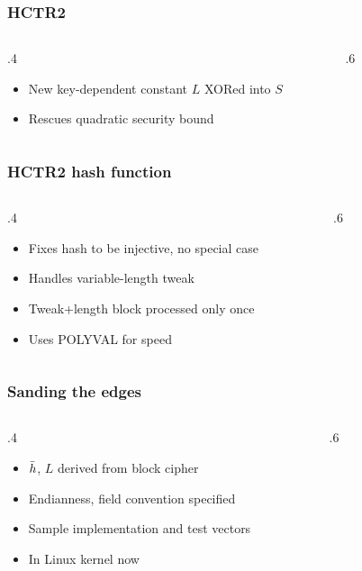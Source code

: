 \documentclass[aspectratio=169]{beamer}
\newenvironment*{figslide}{
    \begin{columns}
        \begin{column}{.4\textwidth}

}{
\end{column}
\begin{column}{.6\textwidth}
    \begin{figure}
        
    \end{figure}
\end{column}
\end{columns}
}
\begin{document}
\togglefalse{oldhctr}

\begin{frame}

\frametitle{HCTR2}
\begin{figslide}
    \begin{itemize}
        \item New key-dependent constant \(L\) XORed into \(S\)
        \item Rescues quadratic security bound
    \end{itemize}
\end{figslide}

\end{frame}

\begin{frame}

\frametitle{HCTR2 hash function}
\begin{figslide}
    \begin{itemize}
        \item Fixes hash to be injective, no special case
        \item Handles variable-length tweak
        \item Tweak+length block processed only once
        \item Uses POLYVAL for speed
    \end{itemize}
\end{figslide}
\end{frame}

\begin{frame}

\frametitle{Sanding the edges}
\begin{figslide}
    \begin{itemize}
        \item \(\bar{h}\), \(L\) derived from block cipher
        \item Endianness, field convention specified
        \item Sample implementation and test vectors
        \item In Linux kernel now
    \end{itemize}

\end{figslide}
\end{frame}
\end{document}
